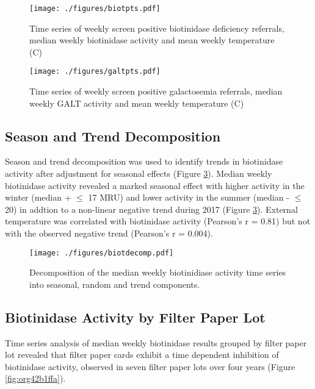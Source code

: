 \documentclass[review]{elsarticle}
\begin{document}
\begin{figure}[htbp]
\centering
\texttt{[image: ./figures/biotpts.pdf]}
\caption{\label{fig:org3251666}Time series of weekly screen positive biotinidase deficiency referrals, median weekly biotinidase activity and mean weekly temperature (\degree{}C)}
\end{figure}

\begin{figure}[htbp]
\centering
\texttt{[image: ./figures/galtpts.pdf]}
\caption{\label{fig:orgcf23ef4}Time series of weekly screen positive galactosemia referrals, median weekly GALT activity and mean weekly temperature (\degree{}C)}
\end{figure}

\clearpage

\subsection*{Season and Trend Decomposition}
\label{sec:orgd2eac43}
Season and trend decomposition was used to identify trends in
biotinidase activity after adjustment for seasonal effects (Figure
\ref{fig:orgd5520fe}). Median weekly biotinidase activity revealed a marked
seasonal effect with higher activity in the winter (median + \(\le\) 17
MRU) and lower activity in the summer (median - \(\le\) 20) in addtion to
a non-linear negative trend during 2017 (Figure \ref{fig:orgd5520fe}). External
temperature was correlated with biotinidase activity (Pearson's r =
0.81) but not with the observed negative trend (Pearson's r = 0.004).

\begin{figure}[htbp]
\centering
\texttt{[image: ./figures/biotdecomp.pdf]}
\caption{\label{fig:orgd5520fe}Decomposition of the median weekly biotinidiase activity time series into seasonal, random and trend components.}
\end{figure}

\clearpage

\subsection*{Biotinidase Activity by Filter Paper Lot}
\label{sec:org46eeb1e}
Time series analysis of median weekly biotinidase results grouped by
filter paper lot revealed that filter paper cards exhibit a time
dependent inhibition of biotinidase activity, observed in seven filter
paper lots over four years (Figure \ref{fig:org42b1ffa}).
\end{document}
